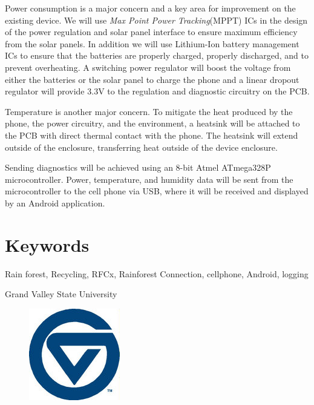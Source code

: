 \documentclass{article}
\newcommand{\Footer}{Grand Valley State University}
\numberwithin{figure}{section}
\numberwithin{equation}{section}
\begin{document}
\begin{flushleft}
\bigskip
Power consumption is a major concern and a key area for improvement on the existing device. We will use \textit{Max Point Power Tracking}(MPPT) ICs in the design of the power regulation and solar panel interface to ensure maximum efficiency from the solar panels. In addition we will use Lithium-Ion battery management ICs to ensure that the batteries are properly charged, properly discharged, and to prevent overheating. A switching power regulator will boost the voltage from either the batteries or the solar panel to charge the phone and a linear dropout regulator will provide 3.3V to the regulation and diagnostic circuitry on the PCB.

\bigskip
Temperature is another major concern. To mitigate the heat produced by the phone, the power circuitry, and the environment, a heatsink will be attached to the PCB with direct thermal contact with the phone. The heatsink will extend outside of the enclosure, transferring heat outside of the device enclosure.

\bigskip
Sending diagnostics will be achieved using an 8-bit Atmel ATmega328P microcontroller. Power, temperature, and humidity data will be sent from the microcontroller to the cell phone via USB, where it will be received and displayed by an Android application.

\section*{Keywords} \label{sect:keywords}
Rain forest, Recycling, RFCx, Rainforest Connection, cellphone, Android, logging

\vfill

\begin{center}
{\large \Footer}
\end{center}
\begin{figure}[H]
  \centering
  \includegraphics[width=.1\textwidth]{small_gvsu}
\end{figure}
\end{flushleft}
\restoregeometry
\newpage
\end{document}
